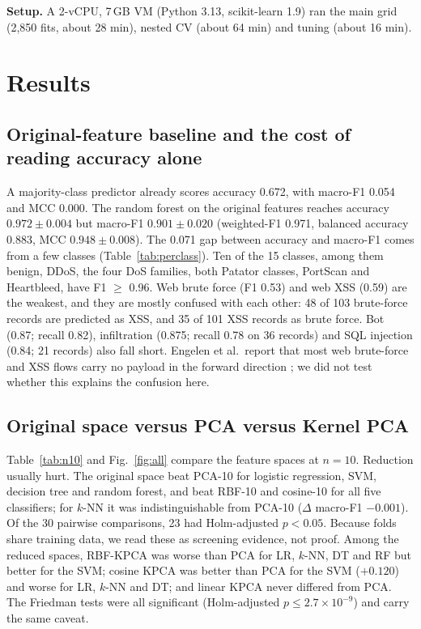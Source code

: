 \documentclass[runningheads]{llncs}
\begin{document}
\textbf{Setup.} A 2-vCPU, 7\,GB VM (Python 3.13, scikit-learn 1.9) ran the main grid (2{,}850 fits, about 28 min), nested CV (about 64 min) and tuning (about 16 min).

\section{Results}
\subsection{Original-feature baseline and the cost of reading accuracy alone}
A majority-class predictor already scores accuracy 0.672, with macro-F1 0.054 and MCC 0.000. The random forest on the original features reaches accuracy $0.972\pm0.004$ but macro-F1 $0.901\pm0.020$ (weighted-F1 0.971, balanced accuracy 0.883, MCC $0.948\pm0.008$). The 0.071 gap between accuracy and macro-F1 comes from a few classes (Table~\ref{tab:perclass}). Ten of the 15 classes, among them benign, DDoS, the four DoS families, both Patator classes, PortScan and Heartbleed, have F1 $\ge$ 0.96. Web brute force (F1 0.53) and web XSS (0.59) are the weakest, and they are mostly confused with each other: 48 of 103 brute-force records are predicted as XSS, and 35 of 101 XSS records as brute force. Bot (0.87; recall 0.82), infiltration (0.875; recall 0.78 on 36 records) and SQL injection (0.84; 21 records) also fall short. Engelen et al.\ report that most web brute-force and XSS flows carry no payload in the forward direction \cite{engelen2021}; we did not test whether this explains the confusion here.

\begin{table}[htbp]
\caption{Per-class results of the selected model (RF, original features), pooled out-of-fold predictions, first repeat.}\label{tab:perclass}
\centering\scriptsize

\end{table}





\subsection{Original space versus PCA versus Kernel PCA}
Table~\ref{tab:n10} and Fig.~\ref{fig:all} compare the feature spaces at $n=10$. Reduction usually hurt. The original space beat PCA-10 for logistic regression, SVM, decision tree and random forest, and beat RBF-10 and cosine-10 for all five classifiers; for $k$-NN it was indistinguishable from PCA-10 ($\Delta$ macro-F1 $-0.001$). Of the 30 pairwise comparisons, 23 had Holm-adjusted $p<0.05$. Because folds share training data, we read these as screening evidence, not proof. Among the reduced spaces, RBF-KPCA was worse than PCA for LR, $k$-NN, DT and RF but better for the SVM; cosine KPCA was better than PCA for the SVM ($+0.120$) and worse for LR, $k$-NN and DT; and linear KPCA never differed from PCA. The Friedman tests were all significant (Holm-adjusted $p\le 2.7\times10^{-9}$) and carry the same caveat.
\end{document}
